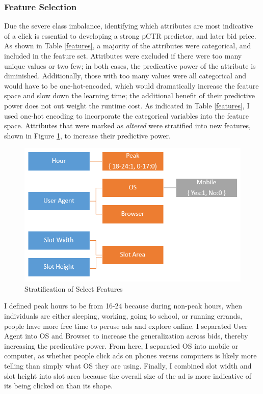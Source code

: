 \documentclass{sig-alternate-05-2015}
\begin{document}
\subsubsection{Feature Selection}

Due the severe class imbalance, identifying which attributes are most indicative of a click is essential to developing a strong pCTR predictor, and later bid price.  As shown in Table \ref{features}, a majority of the attributes were categorical, and included in the feature set.  Attributes were excluded if there were too many unique values or two few; in both cases, the predicative power of the attribute is diminished. Additionally, those with too many values were all categorical and would have to be one-hot-encoded, which would dramatically increase the feature space and slow down the learning time; the additional benefit of their predictive power does not out weight the runtime cost. As indicated in Table \ref{features}, I used one-hot encoding to incorporate the categorical variables into the feature space.  Attributes that were marked as \textit{altered} were stratified into new features, shown in Figure \ref{stratifiedFeatures}, to increase their predictive power.

\begin{figure}[h]
 \centering
 \includegraphics[width=1\linewidth]{modifiedFeatures.png}
 \caption{Stratification of Select Features}
 \label{stratifiedFeatures}
\end{figure}

I defined peak hours to be from 16-24 because during non-peak hours, when individuals are either sleeping, working, going to school, or running errands, people have more free time to peruse ads and explore online. I separated User Agent into OS and Browser to increase the generalization across bids, thereby increasing the predicative power. From here, I separated OS into mobile or computer, as whether people click ads on phones versus computers is likely more telling than simply what OS they are using.  Finally, I combined slot width and slot height into slot area because the overall size of the ad is more indicative of its being clicked on than its shape.
\end{document}
